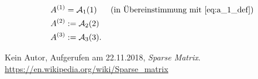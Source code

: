 \documentclass[smallheadings]{scrartcl}
\numberwithin{equation}{section}
\begin{document}
\begin{align}
A^{(1)}&=\mathcal{A}_1(1)\text{~~~~~(in Übereinstimmung mit \eqref{eq:a_1_def})}\\
A^{(2)}&:=\mathcal{A}_2(2)\\
A^{(3)}&:=\mathcal{A}_3(3).
\end{align}

\begin{thebibliography}{9}
 Kein Autor, Aufgerufen am 22.11.2018, \textit{Sparse Matrix}. 
\url{https://en.wikipedia.org/wiki/Sparse_matrix}
\end{thebibliography}


\end{document}
